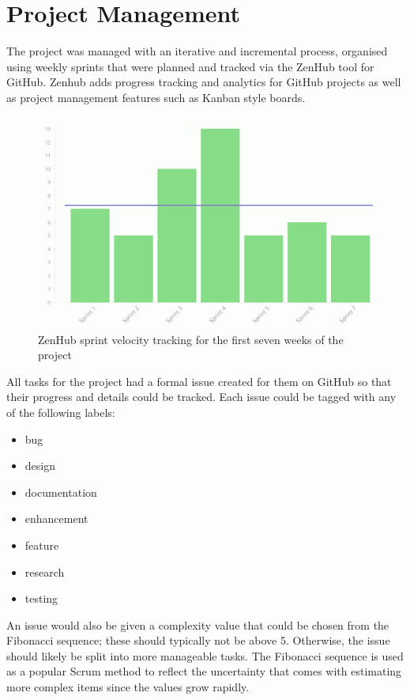\section{Project Management}\label{sec:project-management}
The project was managed with an iterative and incremental process, organised using weekly sprints that were planned and tracked via the ZenHub\cite{_zenhub_????} tool for GitHub. Zenhub adds progress tracking and analytics for GitHub projects as well as project management features such as Kanban style boards.

\begin{figure}
  \vspace{-2mm}
  \centering
  \includegraphics[width=\linewidth]{img/velocity-tracking.png}
  \caption{ZenHub sprint velocity tracking for the first seven weeks of the project}\label{fig:velocity-tracking}
\end{figure}

All tasks for the project had a formal issue created for them on GitHub so that their progress and details could be tracked. Each issue could be tagged with any of the following labels:
\begin{itemize}[noitemsep]
  \item bug
  \item design
  \item documentation
  \item enhancement
  \item feature
  \item research
  \item testing
\end{itemize}

An issue would also be given a complexity value that could be chosen from the Fibonacci sequence; these should typically not be above 5. Otherwise, the issue should likely be split into more manageable tasks. The Fibonacci sequence is used as a popular Scrum method to reflect the uncertainty that comes with estimating more complex items since the values grow rapidly.

